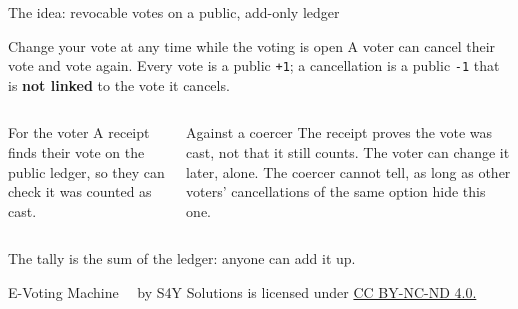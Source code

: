 \documentclass[11pt,aspectratio=169]{beamer}
\newcommand{\currentyear}{\the\year}
\newcommand{\copyrightnote}{
    \vfill
    \begin{flushleft}
    \tiny
    E-Voting Machine \textcopyright~\currentyear~by S4Y Solutions is licensed under
    \href{https://creativecommons.org/licenses/by-nc-nd/4.0}{CC BY-NC-ND 4.0.}
    \end{flushleft}
}
\begin{document}
\begin{frame}{The idea: revocable votes on a public, add-only ledger}
    \begin{exampleblock}{Change your vote at any time while the voting is open}
        A voter can cancel their vote and vote again. Every vote is a public \texttt{+1};
        a cancellation is a public \texttt{-1} that is \textbf{not linked} to the vote it cancels.
    \end{exampleblock}

    \begin{columns}[T]
        \begin{block}{For the voter}
            A receipt finds their vote on the public ledger, so they can check it was counted as cast.
        \end{block}
        \begin{alertblock}{Against a coercer}
            The receipt proves the vote was cast, not that it still counts. The voter can change
            it later, alone. The coercer cannot tell, as long as other voters' cancellations of the
            same option hide this one.
        \end{alertblock}
    \end{columns}

    \medskip
    \small The tally is the sum of the ledger: anyone can add it up.
    \copyrightnote
\end{frame}
\end{document}
